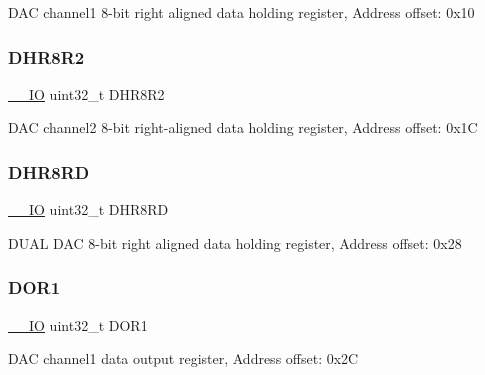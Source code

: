 D\+AC channel1 8-\/bit right aligned data holding register, Address offset\+: 0x10 \mbox{\label{struct_d_a_c___type_def_a4c435f0e34ace4421241cd5c3ae87fc2}} 
\subsubsection{\texorpdfstring{D\+H\+R8\+R2}{DHR8R2}}
{\footnotesize\ttfamily \hyperlink{core__sc300_8h_aec43007d9998a0a0e01faede4133d6be}{\+\_\+\+\_\+\+IO} uint32\+\_\+t D\+H\+R8\+R2}

D\+AC channel2 8-\/bit right-\/aligned data holding register, Address offset\+: 0x1C \mbox{\label{struct_d_a_c___type_def_a9590269cba8412f1be96b0ddb846ef44}} 
\subsubsection{\texorpdfstring{D\+H\+R8\+RD}{DHR8RD}}
{\footnotesize\ttfamily \hyperlink{core__sc300_8h_aec43007d9998a0a0e01faede4133d6be}{\+\_\+\+\_\+\+IO} uint32\+\_\+t D\+H\+R8\+RD}

D\+U\+AL D\+AC 8-\/bit right aligned data holding register, Address offset\+: 0x28 \mbox{\label{struct_d_a_c___type_def_aa710505be03a41981c35bacc7ce20746}} 
\subsubsection{\texorpdfstring{D\+O\+R1}{DOR1}}
{\footnotesize\ttfamily \hyperlink{core__sc300_8h_aec43007d9998a0a0e01faede4133d6be}{\+\_\+\+\_\+\+IO} uint32\+\_\+t D\+O\+R1}

D\+AC channel1 data output register, Address offset\+: 0x2C \mbox{\label{struct_d_a_c___type_def_aba9fb810b0cf6cbc1280c5c63be2418b}} 
